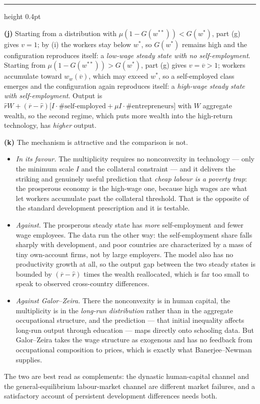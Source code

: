 \documentclass[11pt,letterpaper,reqno]{amsart}
\makeatletter
\newcommand{\ol}[1]{\overline{#1}}
\newcommand{\as@head}[3]{%
  \par\addvspace{1.6ex}\penalty-200\relax
  \phantomsection
  \addcontentsline{toc}{subsection}{#1 #2\texorpdfstring{\ifx\relax#3\relax\else\quad #3\fi}{}}%
  {\color{RuleGrey}\hrule height 0.4pt}%
  \nobreak\vspace{0.8ex}\nobreak
  \noindent{\bfseries #1 #2}%
  \ifx\relax#3\relax\else\quad{\bfseries\itshape #3}\fi
  \par\nobreak\vspace{0.4ex}\nobreak
  \as@beginstatement
}
\newcommand{\as@beginstatement}{\begingroup\itshape\ignorespaces}
\newenvironment{aex}[2]{\as@head{Exercise}{#1}{#2}}{\par\addvspace{1.2ex}}
\renewcommand{\as@beginstatement}{\ignorespaces}
\makeatother
\begin{document}
\begin{aex}{21.13}{}
\textbf{(j)}  Starting from a distribution with $\mu(1-G(w^{**}))<G(w^*)$, part (g) gives $v=1$;
by (i) the workers stay below $w^*$, so $G(w^*)$ remains high and the configuration reproduces
itself: a \emph{low-wage steady state with no self-employment}.  Starting from
$\mu(1-G(w^{**}))>G(w^*)$, part (g) gives $v=\ol v>1$; workers accumulate toward
$w_w(\ol v)$, which may exceed $w^*$, so a self-employed class emerges and the configuration
again reproduces itself: a \emph{high-wage steady state with self-employment}.  Output is
$\hat rW+(\ol r-\hat r)\bigl[I\cdot\#\text{self-employed}+\mu I\cdot\#\text{entrepreneurs}\bigr]$
with $W$ aggregate wealth, so the second regime, which puts more wealth into the high-return
technology, has \emph{higher} output.

\textbf{(k)}  The mechanism is attractive and the comparison is not.
\begin{itemize}
\item \emph{In its favour.}  The multiplicity requires no nonconvexity in technology --- only the
      minimum scale $I$ and the collateral constraint --- and it delivers the striking and
      genuinely useful prediction that \emph{cheap labour is a poverty trap}: the prosperous
      economy is the high-wage one, because high wages are what let workers accumulate past the
      collateral threshold.  That is the opposite of the standard development prescription and it
      is testable.
\item \emph{Against.}  The prosperous steady state has \emph{more} self-employment and fewer wage
      employees.  The data run the other way: the self-employment share falls sharply with
      development, and poor countries are characterized by a mass of tiny own-account firms, not
      by large employers.  The model also has no productivity growth at all, so the output gap
      between the two steady states is bounded by $(\ol r-\hat r)$ times the wealth reallocated,
      which is far too small to speak to observed cross-country differences.
\item \emph{Against Galor--Zeira.}  There the nonconvexity is in human capital, the multiplicity
      is in the \emph{long-run distribution} rather than in the aggregate occupational structure,
      and the prediction --- that initial inequality affects long-run output through education ---
      maps directly onto schooling data.  But Galor--Zeira takes the wage structure as exogenous
      and has no feedback from occupational composition to prices, which is exactly what
      Banerjee--Newman supplies.
\end{itemize}
The two are best read as complements: the dynastic human-capital channel and the
general-equilibrium labour-market channel are different market failures, and a satisfactory
account of persistent development differences needs both.
\end{aex}
\end{document}
